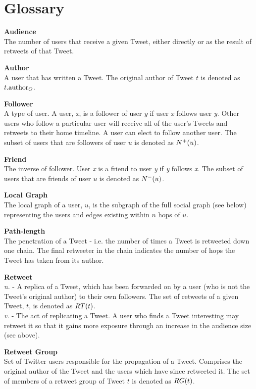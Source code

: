 \chapter*{Glossary} 

{\bf Audience}\\
The number of users that receive a given Tweet, either directly or as the result of retweets of that Tweet.

{\bf Author}\\
A user that has written a Tweet. The original author of Tweet $t$ is denoted as $t.\textrm{author}_O$. 

{\bf Follower}\\
A type of user. A user, \textit{x}, is a follower of user \textit{y} if user \textit{x} follows user \textit{y}. Other users who follow a particular user will receive all of the user's Tweets and retweets to their home timeline. A user can elect to follow another user. The subset of users that are followers of user $u$ is denoted as $N^+(u)$.

{\bf Friend}\\
The inverse of follower. User \textit{x} is a friend to user \textit{y} if \textit{y} follows \textit{x}. The subset of users that are friends of user $u$ is denoted as $N^-(u)$.

{\bf Local Graph}\\
The local graph of a user, $u$, is the subgraph of the full social graph (see below) representing the users and edges existing within $n$ hops of $u$.

{\bf Path-length}\\
The penetration of a Tweet - i.e. the number of times a Tweet is retweeted down one chain. The final retweeter in the chain indicates the number of hops the Tweet has taken from its author.
			
{\bf Retweet}\\
\textit{n.} - A replica of a Tweet, which has been forwarded on by a user (who is not the Tweet's original author) to their own followers. The set of retweets of a given Tweet, $t$, is denoted as $RT(t)$.\\
\textit{v.} - The act of replicating a Tweet. A user who finds a Tweet interesting may retweet it so that it gains more exposure through an increase in the audience size (see above).
									
{\bf Retweet Group}\\
Set of Twitter users responsible for the propagation of a Tweet. Comprises the original author of the Tweet and the users which have since retweeted it. The set of members of a retweet group of Tweet $t$ is denoted as $RG(t)$.

